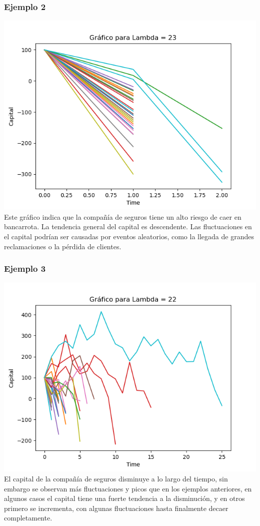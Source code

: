 \documentclass{article}
\begin{document}
 \subsubsection{Ejemplo 2}
 \includegraphics[scale = 0.8]{lamb2.png}
 Este gráfico indica que la compañía de seguros tiene un alto riesgo de caer en bancarrota. La tendencia general del capital es descendente. Las fluctuaciones en el capital podrían ser causadas por eventos aleatorios, como la llegada de grandes reclamaciones o la pérdida de clientes.\\

 \subsubsection{Ejemplo 3}
 \includegraphics[scale = 0.8]{lamb3.png}
 El capital de la compañía de seguros disminuye a lo largo del tiempo, sin embargo se observan más fluctuaciones y picos que en los ejemplos anteriores, en algunos casos el capital tiene una fuerte tendencia a la disminución, y en otros primero se incrementa, con algunas fluctuaciones hasta finalmente decaer completamente. \\
\end{document}
